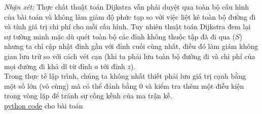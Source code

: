 \textit{Nhận xét: } Thực chất thuật toán Dijkstra vẫn phải duyệt qua toàn bộ cấu 
hình của bài toán và không làm giảm độ phức tạp so với việc liệt kê toàn bộ đường
đi và tính giá trị chi phí cho mỗi cấu hình. Tuy nhiên thuật toán Dijkstra đem lại
sự tường minh mặc dù quét toàn bộ các đỉnh không thuộc tập đã đi qua ($S$) nhưng 
ta chỉ cập nhật đỉnh gần với đỉnh cuối cùng nhất, điều đó làm giảm không gian lưu 
trữ so với cách vét cạn (khi ta phải lưu toàn bộ đường đi và chi phí của mọi đường
đi khả dĩ từ đỉnh $a$ tới đỉnh $z$). \\

Trong thực tế lập trình, chúng ta không nhất thiết phải lưu giá trị cạnh bằng một 
số lớn (vô cùng) mà có thể đánh bằng $0$ và kiểm tra thêm một điều kiện trong vòng 
lặp để tránh sự cồng kềnh của ma trận kề. \\

\href{https://github.com/batman0911/dma_homework/blob/master/hw_01/src/dynamic_programming.ipynb}{python code} 
    cho bài toán
